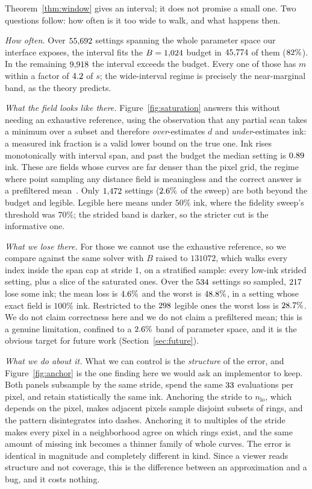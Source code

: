 Theorem~\ref{thm:window} gives an interval; it does not promise a small one. Two
questions follow: how often is it too wide to walk, and what happens then.

\emph{How often.} Over $55{,}692$ settings spanning the whole parameter space
our interface exposes, the interval fits the $B=1{,}024$ budget in $45{,}774$ of
them ($82\%$). In the remaining $9{,}918$ the interval exceeds the
budget. Every one of those has $m$ within a factor of $4.2$ of $s$;
the wide-interval regime is precisely the near-marginal band, as the theory
predicts.

\emph{What the field looks like there.} Figure~\ref{fig:saturation} answers this
without needing an exhaustive reference, using the observation that any partial
scan takes a minimum over a subset and therefore \emph{over}-estimates $d$ and
\emph{under}-estimates ink: a measured ink fraction is a valid lower bound on the
true one. Ink rises monotonically with interval span, and past the budget the median
setting is $0.89$ ink. These are fields whose curves are far denser than
the pixel grid, the regime where point sampling any distance field is
meaningless and the correct answer is a prefiltered
mean~\cite{Norton1982, Bruneton2012}. Only $1{,}472$ settings
($2.6\%$ of the sweep) are both beyond the budget and
legible. Legible here means under $50\%$ ink, where the fidelity sweep's
threshold was $70\%$; the strided band is darker, so the stricter cut is the
informative one.

\emph{What we lose there.} For those we cannot use the exhaustive reference, so we
compare against the same solver with $B$ raised to $131072$, which walks every
index inside the span cap at stride $1$, on a stratified sample: every
low-ink strided setting, plus a slice of the saturated ones. Over the
$534$ settings so sampled,
$217$ lose some ink; the mean loss is $4.6\%$ and the worst is
$48.8\%$, in a setting whose exact field is $100\%$ ink. Restricted to the
$298$ legible ones the worst loss is $28.7\%$. We do not
claim correctness here and we do not claim a prefiltered mean; this is a genuine
limitation, confined to a $2.6\%$ band of parameter space, and it
is the obvious target for future work (Section~\ref{sec:future}).

\emph{What we do about it.} What we can control is the \emph{structure} of the
error, and Figure~\ref{fig:anchor} is the one finding here we would ask an
implementor to keep.
Both panels subsample by the same stride, spend the same $33$ evaluations
per pixel, and retain statistically the same ink. Anchoring the stride to
$n_{\mathrm{lo}}$, which depends on the pixel, makes adjacent pixels sample
disjoint subsets of rings, and the pattern disintegrates into dashes. Anchoring it
to multiples of the stride makes every pixel in a neighborhood agree on which
rings exist, and the same amount of missing ink becomes a thinner family of whole
curves. The error is identical in magnitude and completely different in kind. Since
a viewer reads structure and not coverage, this is the difference between an
approximation and a bug, and it costs nothing.
